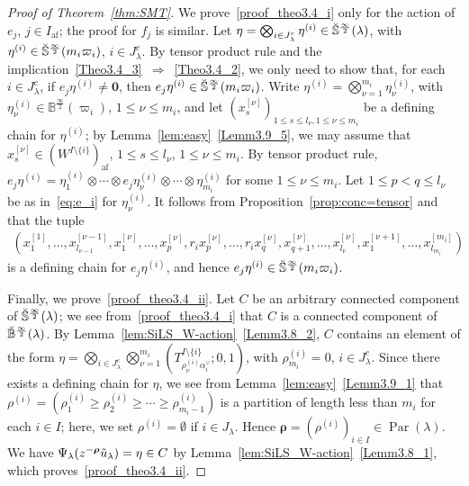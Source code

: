 \documentclass[10pt]{amsart}
\theoremstyle{definition}\newtheorem{defi}[theo]{Definition}
\theoremstyle{remark}\newtheorem{rema}[theo]{Remark}
\newcommand\bm[1]{\boldsymbol{#1}}
\newcommand\bmrho[1]{\boldsymbol{#1}}
\newcommand{\si}{\frac{\infty}{2}}
\DeclareMathOperator{\af}{af}
\DeclareMathOperator{\Par}{Par}
\begin{document}
\begin{proof}[Proof of Theorem~\ref{thm:SMT}]
We prove~\ref{proof_theo3.4_i} only for the action of $e_j$, $j \in I_{\af}$; 
the proof for $f_j$ is similar. 
Let 
$\eta = \bigotimes_{i \in J_{\lambda}^c} \eta^{(i)}\in \Breve{\mathbb{S}}^{\si}(\lambda)$, 
with 
$\eta^{(i)}\in \Breve{\mathbb{S}}^{\si}(m_i \varpi_i)$, 
$i \in J_{\lambda}^c$. 
By tensor product rule 
and the implication~\ref{Theo3.4_3}~$\Rightarrow $~\ref{Theo3.4_2}, 
we only need to show that, for each 
$i \in J_{\lambda}^c$, 
if 
$e_j \eta^{(i)} \neq \bm{0}$, 
then 
$e_j \eta^{(i)} \in \Breve{\mathbb{S}}^{\si}(m_i \varpi_i)$. 
Write 
$\eta^{(i)} = \bigotimes_{\nu = 1}^{m_i} \eta^{(i)}_{\nu}$, 
with 
$\eta^{(i)}_{\nu} \in \mathbb{B}^{\si}(\varpi_i)$, 
$1 \leq \nu \leq m_i$, 
and let
$(x^{[\nu]}_s)_{1 \leq s \leq l_{\nu}, 1 \leq \nu \leq m_i}$
be a defining chain for 
$\eta^{(i)}$; 
by Lemma~\ref{lem:easy}~\ref{Lemm3.9_5}, 
we may assume that 
$x^{[\nu]}_s \in (W^{I \setminus \{ i \}})_{\af}$, 
$1 \leq s \leq l_{\nu}$, 
$1 \leq \nu \leq m_i$.
By tensor product rule, 
$e_j \eta^{(i)} = 
\eta^{(i)}_1 \otimes \cdots \otimes e_j \eta^{(i)}_{\nu} \otimes \cdots \otimes \eta^{(i)}_{m_i}$
for some
$1 \leq \nu \leq m_i$. 
Let 
$1 \leq p < q \leq l_{\nu}$
be as in~\eqref{eq:e_i} for $\eta^{(i)}_{\nu}$. 
It follows from 
Proposition~\ref{prop:conc=tensor} 
and~\cite[Lemma~4.1.6]{INS16} 
that the tuple
\begin{align}
\left( 
x^{[1]}_1 , \ldots , x^{[\nu-1]}_{l_{\nu -1}}, 
x^{[\nu]}_1 , \ldots , x^{[\nu]}_p , r_i x^{[\nu]}_p , \ldots , 
r_i x^{[\nu]}_q , x^{[\nu]}_{q+1} , \ldots , x^{[\nu]}_{l_{\nu}} , 
x^{[\nu +1]}_1 , \ldots , x^{[m_i]}_{l_{m_i}}
\right)
\end{align}
is a defining chain for 
$e_j \eta^{(i)}$, 
and hence 
$e_j \eta^{(i)} \in \Breve{\mathbb{S}}^{\si}(m_i \varpi_i)$. 

Finally, we prove~\ref{proof_theo3.4_ii}. 
Let 
$C$ 
be an arbitrary connected component of 
$\Breve{\mathbb{S}}^{\si}(\lambda)$; 
we see from~\ref{proof_theo3.4_i} that 
$C$ 
is a connected component of 
$\Breve{\mathbb{B}}^{\si}(\lambda)$. 
By Lemma~\ref{lem:SiLS_W-action}~\ref{Lemm3.8_2}, 
$C$ 
contains an element of the form 
$\eta = \bigotimes_{i \in J_{\lambda}^c} \bigotimes_{\nu = 1}^{m_i} \left(T^{I \setminus \{ i \}}_{\rho^{(i)}_{\nu} \alpha_i^{\vee}};0,1 \right)$, 
with 
$\rho^{(i)}_{m_i} = 0$, 
$i \in J_{\lambda}^c$. 
Since there exists a defining chain for $\eta$, 
we see from Lemma~\ref{lem:easy}~\ref{Lemm3.9_1} that 
$\rho^{(i)} = (\rho^{(i)}_1 \geq \rho^{(i)}_2 \geq \cdots \geq \rho^{(i)}_{m_i -1})$
is a partition of length less than $m_i$ 
for each $i \in I$; 
here, we set 
$\rho^{(i)} = \emptyset$ 
if 
$i \in J_{\lambda}$. 
Hence 
$\bmrho{\rho} = (\rho^{(i)})_{i \in I} \in \Par (\lambda)$. 
We have 
$\Psi_{\lambda}(z^{-\bmrho{\rho}} \Tilde{u}_{\lambda}) = \eta \in C$
by Lemma~\ref{lem:SiLS_W-action}~\ref{Lemm3.8_1}, 
which proves~\ref{proof_theo3.4_ii}. 
\end{proof}
\end{document}
